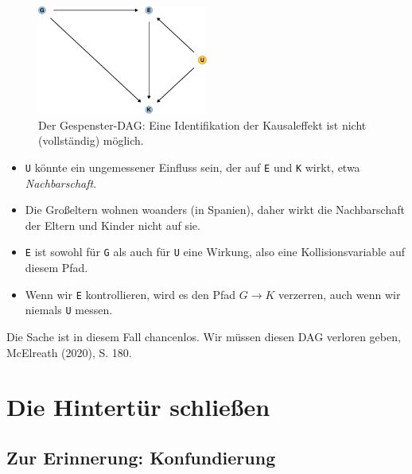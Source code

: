 \documentclass[
  a4paper,
  DIV=11]{scrreprt}
\theoremstyle{definition}
\theoremstyle{remark}
\begin{document}
\begin{figure}

{\centering \includegraphics[width=0.5\textwidth,height=\textheight]{./kausal_files/figure-pdf/fig-dag-ghost-1.pdf}

}

\caption{\label{fig-dag-ghost}Der Gespenster-DAG: Eine Identifikation
der Kausaleffekt ist nicht (vollständig) möglich.}

\end{figure}

\begin{itemize}
\item
  \texttt{U} könnte ein ungemessener Einfluss sein, der auf \texttt{E}
  und \texttt{K} wirkt, etwa \emph{Nachbarschaft}.
\item
  Die Großeltern wohnen woanders (in Spanien), daher wirkt die
  Nachbarschaft der Eltern und Kinder nicht auf sie.
\item
  \texttt{E} ist sowohl für \texttt{G} als auch für \texttt{U} eine
  Wirkung, also eine Kollisionsvariable auf diesem Pfad.
\item
  Wenn wir \texttt{E} kontrollieren, wird es den Pfad
  \(G \rightarrow K\) verzerren, auch wenn wir niemals \texttt{U}
  messen.
\end{itemize}

Die Sache ist in diesem Fall chancenlos. Wir müssen diesen DAG verloren
geben, McElreath (2020), S. 180.

\hypertarget{die-hintertuxfcr-schlieuxdfen}{%
\section{Die Hintertür schließen}\label{die-hintertuxfcr-schlieuxdfen}}

\hypertarget{zur-erinnerung-konfundierung}{%
\subsection{Zur Erinnerung:
Konfundierung}\label{zur-erinnerung-konfundierung}}
\end{document}
